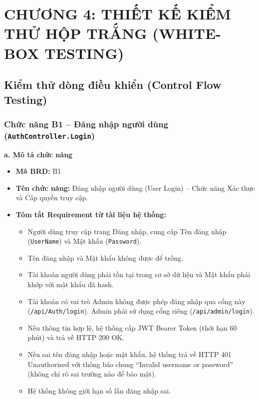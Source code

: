 \documentclass[11pt,a4paper]{article}
\begin{document}
\pagebreak
\section{CHƯƠNG 4: THIẾT KẾ KIỂM THỬ HỘP TRẮNG (WHITE-BOX TESTING)}

\subsection{Kiểm thử dòng điều khiển (Control Flow Testing)}

\subsubsection{Chức năng B1 -- Đăng nhập người dùng (\texttt{AuthController.Login})}

\noindent\textbf{a. Mô tả chức năng}
\begin{itemize}[leftmargin=1.2cm, noitemsep]
    \item[\textbf{--}] \textbf{Mã BRD:} B1
    \item[\textbf{--}] \textbf{Tên chức năng:} Đăng nhập người dùng (User Login) -- Chức năng Xác thực và Cấp quyền truy cập.
    \item[\textbf{--}] \textbf{Tóm tắt Requirement từ tài liệu hệ thống:}
    \begin{itemize}[leftmargin=0.8cm, label=$\bullet$, noitemsep]
        \item Người dùng truy cập trang Đăng nhập, cung cấp Tên đăng nhập (\texttt{UserName}) và Mật khẩu (\texttt{Password}).
        \item Tên đăng nhập và Mật khẩu không được để trống.
        \item Tài khoản người dùng phải tồn tại trong cơ sở dữ liệu và Mật khẩu phải khớp với mật khẩu đã hash.
        \item Tài khoản có vai trò Admin không được phép đăng nhập qua cổng này (\texttt{/api/Auth/login}). Admin phải sử dụng cổng riêng (\texttt{/api/admin/login}).
        \item Nếu thông tin hợp lệ, hệ thống cấp JWT Bearer Token (thời hạn 60 phút) và trả về HTTP 200 OK.
        \item Nếu sai tên đăng nhập hoặc mật khẩu, hệ thống trả về HTTP 401 Unauthorized với thông báo chung ``Invalid username or password'' (không chỉ rõ sai trường nào để bảo mật).
        \item Hệ thống không giới hạn số lần đăng nhập sai.
    \end{itemize}
\end{itemize}
\end{document}
